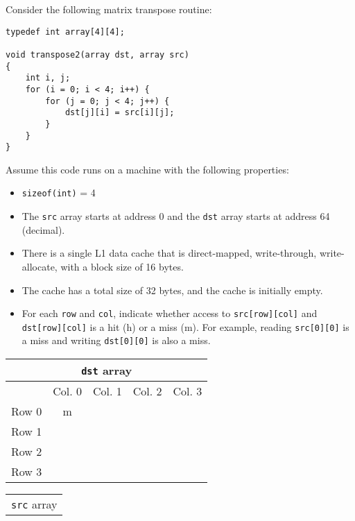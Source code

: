 \documentclass[12pt]{article}
\newenvironment{ex}[2][Exercise]{\begin{trivlist}
		\item[\hskip \labelsep {\bfseries #1}\hskip \labelsep {\bfseries #2.}]}{\end{trivlist}}
\begin{document}
\begin{ex}{6.34}
	Consider the following matrix transpose routine:
	\begin{lstlisting}
typedef int array[4][4];

void transpose2(array dst, array src)
{
	int i, j;
	for (i = 0; i < 4; i++) {
		for (j = 0; j < 4; j++) {
			dst[j][i] = src[i][j];
		}
	}
}
	\end{lstlisting}
	Assume this code runs on a machine with the following properties:
	\begin{itemize}
		\item \texttt{sizeof(int)} = 4
		\item The \texttt{src} array starts at address 0 and the \texttt{dst} array starts at address 64
		(decimal).
		\item There is a single L1 data cache that is direct-mapped, write-through, write-allocate, with
		a block size of 16 bytes.
		\item The cache has a total size of 32 bytes, and the cache is initially empty.
		\item For each \texttt{row} and \texttt{col}, indicate whether access to 
		\texttt{src[row][col]} and \texttt{dst[row][col]} is a hit (h) or a miss (m). For example,
		reading \texttt{src[0][0]} is a miss and writing \texttt{dst[0][0]} is also a miss.
	\end{itemize}
	\begin{center}
		\begin{tabular}{ccccc}
			\multicolumn{5}{c}{\texttt{dst} array} \\
			\hline
			{} & Col. 0 & Col. 1 & {} Col. 2 & {} Col. 3\\
			\hline
			Row 0 & m & \makebox[1cm]{\hrulefill} & \makebox[1cm]{\hrulefill} & \makebox[1cm]{\hrulefill}\\
			Row 1 & \makebox[1cm]{\hrulefill} & \makebox[1cm]{\hrulefill} & \makebox[1cm]{\hrulefill} & \makebox[1cm]{\hrulefill}\\
			Row 2 & \makebox[1cm]{\hrulefill} & \makebox[1cm]{\hrulefill} & \makebox[1cm]{\hrulefill} & \makebox[1cm]{\hrulefill}\\
			Row 3 & \makebox[1cm]{\hrulefill} & \makebox[1cm]{\hrulefill} & \makebox[1cm]{\hrulefill} & \makebox[1cm]{\hrulefill}\\
		\end{tabular}
	\end{center}
	\begin{center}
		\begin{tabular}{ccccc}
			\multicolumn{5}{c}{\texttt{src} array} \\

\end{tabular}
\end{center}
\end{ex}
\end{document}
